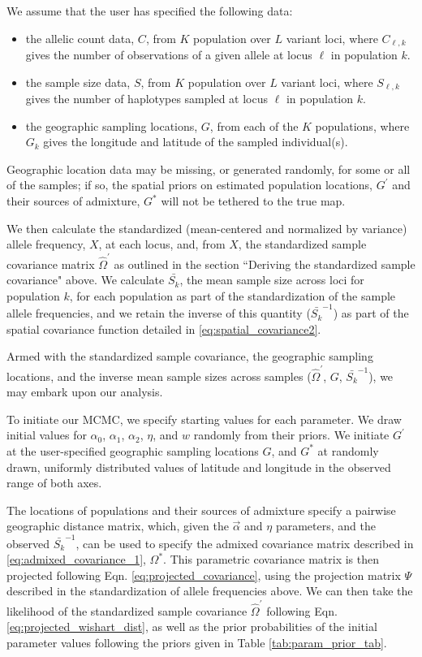 \documentclass[12pt]{article}
\newcommand{\identifyadmixsource}[1]{{#1^{*}}}
\begin{document}
We assume that the user has specified the following data: 
\begin{itemize}
\item the allelic count data, $C$, from $K$ population over $L$ variant loci, where $C_{\ell,k}$ gives the number of observations of a given allele at locus $\ell$ in population $k$. 
\item the sample size data, $S$, from $K$ population over $L$ variant loci, where $S_{\ell,k}$ gives the number of haplotypes sampled at locus $\ell$ in population $k$.
\item the geographic sampling locations, $G$, from each of the $K$ populations, where $G_k$ gives the longitude and latitude of the sampled individual(s).
\end{itemize}

Geographic location data may be missing, or generated randomly, for some or all of the samples; if so, the spatial priors on estimated population locations, $G^{\prime}$ and their sources of admixture, $\identifyadmixsource{G}$ will not be tethered to the true map. 

We then calculate the standardized (mean-centered and normalized by variance) allele frequency, $X$, at each locus, and, from $X$, the standardized sample covariance matrix $\widehat{\Omega}^{\prime}$ as outlined in the section ``Deriving the standardized sample covariance" above.  We calculate $\bar{S_k}$, the mean sample size across loci for population $k$, for each population as part of the standardization of the sample allele frequencies, and we retain the inverse of this quantity ($\bar{S_k}^{-1}$) as part of the spatial covariance function detailed in \eqref{eq:spatial_covariance2}.

Armed with the standardized sample covariance, the geographic sampling locations, and the inverse mean sample sizes across samples ($\widehat{\Omega}^{\prime}$, $G$, $\bar{S_k}^{-1}$), we may embark upon our analysis.

To initiate our MCMC, we specify starting values for each parameter.  We draw initial values for $\alpha_0$, $\alpha_1$, $\alpha_2$, $\eta$, and $w$ randomly from their priors.  We initiate $G^{\prime}$ at the user-specified geographic sampling locations $G$, and $\identifyadmixsource{G}$ at randomly drawn, uniformly distributed values of latitude and longitude in the observed range of both axes.  

The locations of populations and their sources of admixture specify a pairwise geographic distance matrix, which, given the $\vec{\alpha}$ and $\eta$ parameters, and the observed $\bar{S_k}^{-1}$, can be used to specify the admixed covariance matrix described in \eqref{eq:admixed_covariance_1}, $\identifyadmixsource{\Omega}$.  This parametric covariance matrix is then projected following Eqn. \eqref{eq:projected_covariance}, using the projection matrix $\Psi$ described in the standardization of allele frequencies above.  We can then take the likelihood of the standardized sample covariance $\widehat{\Omega}^{\prime}$ following Eqn. \eqref{eq:projected_wishart_dist}, as well as the prior probabilities of the initial parameter values following the priors given in Table \ref{tab:param_prior_tab}.
\end{document}
